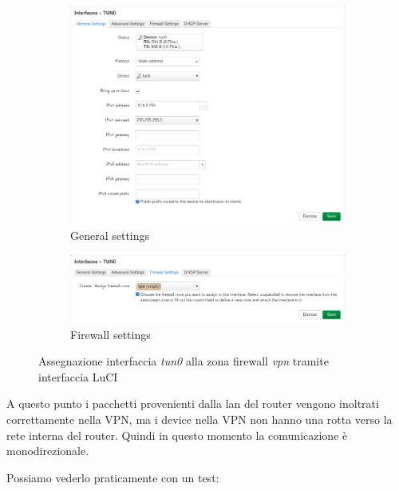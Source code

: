 \begin{figure}[H]
    \centering
    \begin{subfigure}{1\linewidth}
        \centering
        \includegraphics[width=1\linewidth]{immagini/LuCI_int_tun0_1}
        \caption{General settings}
        \label{fig:luci-firewall-interfaces}
    \end{subfigure}
    \medskip
    \begin{subfigure}{1\linewidth}
        \centering
        \includegraphics[width=1\linewidth]{immagini/LuCI_int_tun0_2}
        \caption{Firewall settings}
        \label{fig:luci-firewall-interfaces1}
    \end{subfigure}
    \caption{Assegnazione interfaccia \textit{tun0} alla zona firewall \textit{vpn} tramite interfaccia LuCI}
\end{figure}

A questo punto i pacchetti provenienti dalla lan del router vengono inoltrati correttamente nella VPN, ma i device nella VPN non hanno una rotta verso la rete interna del router. Quindi in questo momento la comunicazione è monodirezionale.

Possiamo vederlo praticamente con un test:

